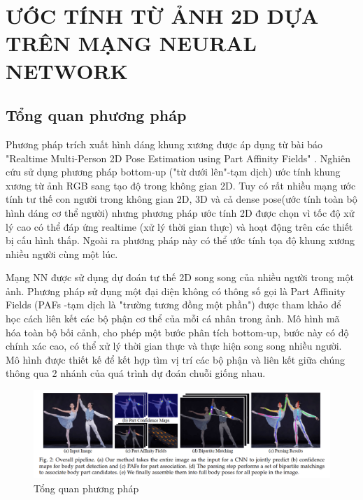 \section{ƯỚC TÍNH TỪ ẢNH 2D DỰA TRÊN MẠNG NEURAL NETWORK}
\label{ss:2Dpose}
\subsection{Tổng quan phương pháp}
\label{sss:tong_quan_2D_pose}
Phương pháp trích xuất hình dáng khung xương được áp dụng từ bài báo "Realtime Multi-Person 2D Pose Estimation using Part Affinity Fields" \cite{cao2017realtime}. Nghiên cứu sử dụng phương pháp bottom-up ("từ dưới lên"-tạm dịch) ước tính khung xương từ ảnh RGB sang tạo độ trong không gian 2D. Tuy có rất nhiều mạng ước tính tư thế con người trong không gian 2D, 3D và cả dense pose(ước tính toàn bộ hình dáng cơ thể người) nhưng phương pháp ước tính 2D được chọn vì tốc độ xử lý cao có thể đáp ứng realtime (xử lý thời gian thực) và hoạt động trên các thiết bị cấu hình thấp. Ngoài ra phương pháp này có thể ước tính tọa độ khung xương nhiều người cùng một lúc.

Mạng NN được sử dụng dự đoán tư thế 2D song song của nhiều người trong một ảnh. Phương pháp sử dụng một đại diện không có thông số gọi là Part Affinity Fields (PAFs -tạm dịch là "trường tương đồng một phần") được tham khảo để học cách liên kết các bộ phận cơ thể của mỗi cá nhân trong ảnh. Mô hình mã hóa toàn bộ bối cảnh, cho phép một bước phân tích bottom-up, bước này có độ chính xác cao, có thể xử lý thời gian thực và thực hiện song song nhiều người. Mô hình được thiết kế để kết hợp tìm vị trí các bộ phận và liên kết giữa chúng thông qua 2 nhánh của quá trình dự đoán chuỗi giống nhau.


\FloatBarrier
\begin{figure}[htp]
\begin{center}
\includegraphics[scale=0.3]{chap3/c3_figs/pipeline.png}
\end{center}
\caption{Tổng quan phương pháp}
\label{fig:pipeline}
\end{figure}
\FloatBarrier

